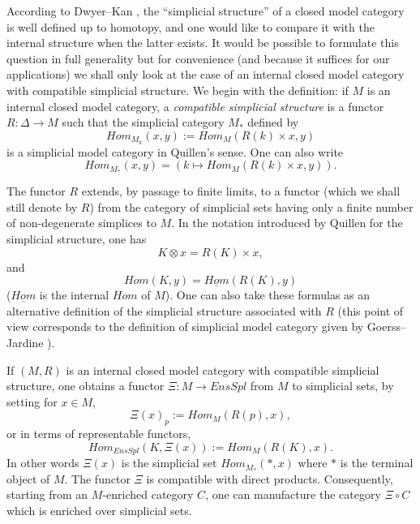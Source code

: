 
According to Dwyer--Kan \cite{DwyerKan3}, the ``simplicial structure'' of a
closed model category is well defined up to homotopy, and one would like to
compare it with the internal structure when the latter exists.
It would be possible to formulate this question in full generality but
for convenience (and because it suffices for our applications) we shall
only look at the case of an internal closed model category with
compatible simplicial structure. We begin with the
definition: if $M$ is an internal closed model category, a
{\em compatible simplicial structure} is a functor $R: \Delta \rightarrow M$
such that the simplicial category $M_{\ast}$
defined by
$$
Hom _{M_k}(x,y):= Hom _M(R(k) \times x, y)
$$
is a simplicial model category in Quillen's sense.
One can also write
$$
Hom_{M_{\ast}}(x,y) = \left( k\mapsto Hom _M(R(k)\times x, y) \right) .
$$

The functor
$R$ extends, by passage to finite limits, to a functor (which we shall still
denote by $R$) from the category
of simplicial sets having only a finite number of non-degenerate simplices
to $M$. In the notation introduced by Quillen for the simplicial
structure, one has
$$
K\otimes x = R(K)\times x,
$$
and
$$
Hom (K, y) = \underline{Hom}(R(K), y)
$$
($\underline{Hom}$ is the internal $Hom$
of $M$). One can also take these formulas as
an alternative definition of the simplicial structure associated with $R$
(this point of view corresponds to
the definition of simplicial model category
given by Goerss--Jardine \cite{JardineGoerssBook}).

If $(M,R)$ is an internal closed model category with compatible simplicial
structure, one obtains a functor $\Xi : M\rightarrow EnsSpl$
from $M$ to simplicial sets, by setting for $x\in M$,
$$
\Xi (x)_p := Hom _M(R(p), x),
$$
or in terms of representable functors,
$$
Hom _{EnsSpl}(K, \Xi (x)):= Hom _M(R(K), x).
$$
In other words $\Xi (x)$ is the simplicial set
$Hom_{M_{\ast}}(\ast , x)$ where $\ast$ is the terminal object of $M$.
The functor $\Xi$ is compatible with direct products. Consequently,
starting from an $M$-enriched category $C$, one can manufacture the
category $\Xi \circ  C$ which is
enriched over simplicial sets.

